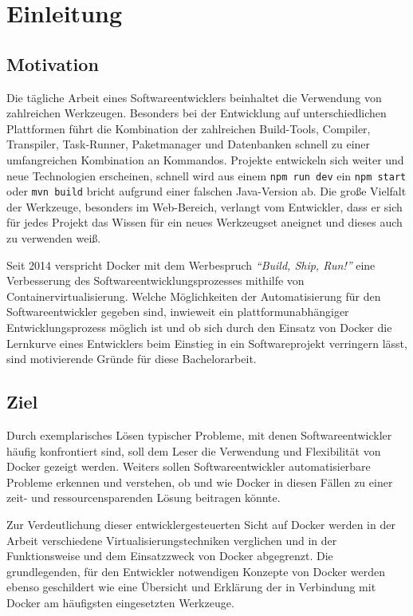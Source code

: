 \chapter{Einleitung}
\section{Motivation}
Die tägliche Arbeit eines Softwareentwicklers beinhaltet die Verwendung von zahlreichen Werkzeugen.
Besonders bei der Entwicklung auf unterschiedlichen Plattformen führt die Kombination der zahlreichen Build-Tools, Compiler, Transpiler, Task-Runner, Paketmanager und Datenbanken schnell zu einer umfangreichen Kombination an Kommandos.
Projekte entwickeln sich weiter und neue Technologien erscheinen, schnell wird aus einem \texttt{npm run dev} ein \texttt{npm start} oder \texttt{mvn build} bricht aufgrund einer falschen Java-Version ab.
Die große Vielfalt der Werkzeuge, besonders im Web-Bereich, verlangt vom Entwickler, dass er sich für jedes Projekt das Wissen für ein neues Werkzeugset aneignet und dieses auch zu verwenden weiß.

Seit 2014 verspricht Docker mit dem Werbespruch \emph{"`Build, Ship, Run!"'} eine Verbesserung des Softwareentwicklungsprozesses mithilfe von Containervirtualisierung.
Welche Möglichkeiten der Automatisierung für den Softwareentwickler gegeben sind, inwieweit ein plattformunabhängiger Entwicklungsprozess möglich ist und ob sich durch den Einsatz von Docker die Lernkurve eines Entwicklers beim Einstieg in ein Softwareprojekt verringern lässt, sind motivierende Gründe für diese Bachelorarbeit.

\section{Ziel}
Durch exemplarisches Lösen typischer Probleme, mit denen Softwareentwickler häufig konfrontiert sind, soll dem Leser die Verwendung und Flexibilität von Docker gezeigt werden.
Weiters sollen Softwareentwickler automatisierbare Probleme erkennen und verstehen, ob und wie Docker in diesen Fällen zu einer zeit- und ressourcensparenden Lösung beitragen könnte.

Zur Verdeutlichung dieser entwicklergesteuerten Sicht auf Docker werden in der Arbeit verschiedene Virtualisierungstechniken verglichen und in der Funktionsweise und dem Einsatzzweck von Docker abgegrenzt.
Die grundlegenden, für den Entwickler notwendigen Konzepte von Docker werden ebenso geschildert wie eine Übersicht und Erklärung der in Verbindung mit Docker am häufigsten eingesetzten Werkzeuge.

